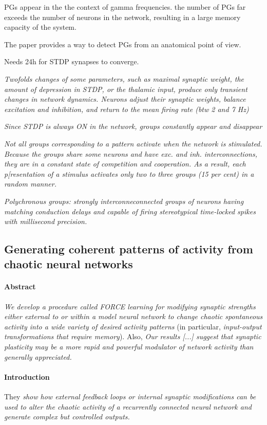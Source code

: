 \documentclass[12pt]{article}
\begin{document}
PGs appear in the the context of gamma frequencies. the number of PGs far exceeds the number of neurons in the network, resulting in a large memory capacity of the system.

The paper provides a way to detect PGs from an anatomical point of view.

Needs 24h for STDP synapses to converge.

\textit{Twofolds changes of some parameters, such as maximal synaptic weight, the amount of depression in STDP, or the thalamic input, produce only transient changes in network dynamics. Neurons adjust their synaptic weights, balance excitation and inhibition, and return to the mean firing rate (btw 2 and 7 Hz)}

\textit{Since STDP is always ON in the network, groups constantly appear and disappear} 

\textit{Not all groups corresponding to a pattern activate when the network is stimulated. Because the groups share some neurons and have exc. and inh. interconnections, they are in a constant state of competition and cooperation. As a result, each p[resentation of a stimulus activates only two to three groups (15 per cent) in a random manner.}

\textit{Polychronous groups: strongly interconneconnected groups of neurons having matching conduction delays and capable of firing stereotypical time-locked spikes with millisecond precision.}


\subsection{Generating coherent patterns of activity from chaotic neural networks \cite{sussillo2009generating}}

\paragraph{Abstract}
\textit{We develop a procedure called FORCE learning for modifying synaptic strengths either external to or within a model neural network to change chaotic spontaneous activity into a wide variety of desired activity patterns} (in particular, \textit{input-output transformations that require memory}). Also, \textit{Our results [...] suggest that synaptic plasticity may be a more rapid and powerful modulator of network activity than generally appreciated.}

\paragraph{Introduction}
They \textit{show how external feedback loops or internal synaptic modifications can be used to alter the chaotic activity of a recurrently connected neural network and generate complex but controlled outputs.}
\end{document}

